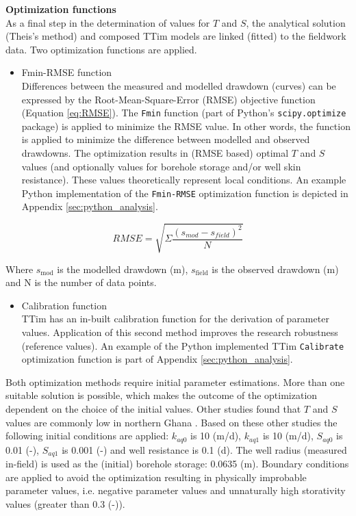 \textbf{Optimization functions} \\
As a final step in the determination of values for $T$ and $S$, the analytical solution (Theis's method) and composed TTim models are linked (fitted) to the fieldwork data. Two optimization functions are applied.

\begin{itemize}
\item{Fmin-RMSE function} \\
Differences between the measured and modelled drawdown (curves) can be expressed by the Root-Mean-Square-Error (RMSE) objective function (Equation \ref{eq:RMSE}). The \texttt{Fmin} function (part of Python's \texttt{scipy.optimize} package) is applied to minimize the RMSE value. In other words, the function is applied to minimize the difference between modelled and observed drawdowns. The optimization results in (RMSE based) optimal $T$ and $S$ values (and optionally values for borehole storage and/or well skin resistance). These values theoretically represent local conditions. An example Python implementation of the \texttt{Fmin-RMSE} optimization function is depicted in Appendix \ref{sec:python_analysis}. 
\end{itemize}

\begin{equation}
\label{eq:RMSE}
 RMSE = \sqrt{\Sigma\frac{(s_{mod}-s_{field})^{2}}{N}}
\end{equation}

Where $s_{\text{mod}}$ is the modelled drawdown (m), $s_{\text{field}}$ is the observed drawdown (m) and N is the number of data points. \\
 
\begin{itemize}
\item{Calibration function} \\
TTim has an in-built calibration function for the derivation of parameter values. Application of this second method improves the research robustness (reference values). An example of the Python implemented TTim \texttt{Calibrate} optimization function is part of Appendix \ref{sec:python_analysis}. \\
\end{itemize}

Both optimization methods require initial parameter estimations. More than one suitable solution is possible, which makes the outcome of the optimization dependent on the choice of the initial values. Other studies found that $T$ and $S$ values are commonly low in northern Ghana \citep[e.g.][]{Owusu2015,Owusu2017}. Based on these other studies the following initial conditions are applied: $k_{aq0}$ is 10 (m/d), $k_{aq1}$ is 10 (m/d), $S_{aq0}$ is 0.01 (-), $S_{aq1}$ is 0.001 (-) and well resistance is 0.1 (d). The well radius (measured in-field) is used as the (initial) borehole storage: 0.0635 (m). Boundary conditions are applied to avoid the optimization resulting in physically improbable parameter values, i.e. negative parameter values and unnaturally high storativity values (greater than 0.3 (-)).

